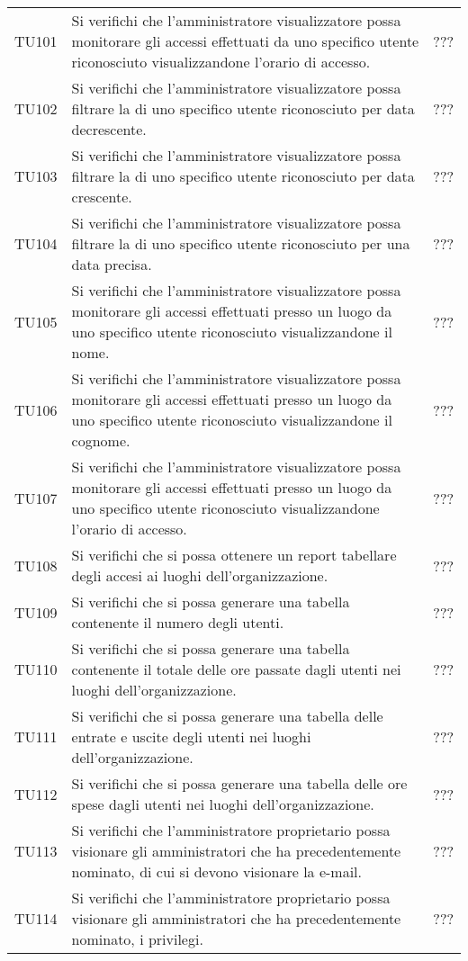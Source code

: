 {\begin{longtable}{ c  C{9cm} C{1cm}}
TU101 & Si verifichi che l’amministratore visualizzatore possa monitorare gli accessi effettuati da uno specifico utente riconosciuto visualizzandone l’orario di accesso. & ??? \\
TU102 & Si verifichi che l’amministratore visualizzatore possa filtrare la  di uno specifico utente riconosciuto per data decrescente. & ??? \\
TU103 & Si verifichi che l’amministratore visualizzatore possa filtrare la  di uno specifico utente riconosciuto per data crescente. & ??? \\
TU104 & Si verifichi che l’amministratore visualizzatore possa filtrare la  di uno specifico utente riconosciuto per una data precisa. & ??? \\
TU105 & Si verifichi che l’amministratore visualizzatore possa monitorare gli accessi effettuati presso un luogo da uno specifico utente riconosciuto visualizzandone il nome. & ??? \\
TU106 & Si verifichi che l’amministratore visualizzatore possa monitorare gli accessi effettuati presso un luogo da uno specifico utente riconosciuto visualizzandone il cognome. & ??? \\
TU107 & Si verifichi che l’amministratore visualizzatore possa monitorare gli accessi effettuati presso un luogo da uno specifico utente riconosciuto visualizzandone l’orario di accesso. & ??? \\
TU108 & Si verifichi che si possa ottenere un report tabellare degli accesi ai luoghi dell'organizzazione. & ??? \\
TU109 & Si verifichi che si possa generare una tabella contenente il numero degli utenti. & ??? \\
TU110 & Si verifichi che si possa generare una tabella contenente il totale delle ore passate dagli utenti nei luoghi dell’organizzazione. & ??? \\
TU111 & Si verifichi che si possa generare una tabella delle entrate e uscite degli utenti nei luoghi dell'organizzazione. & ??? \\
TU112 & Si verifichi che si possa generare una tabella delle ore spese dagli utenti nei luoghi dell'organizzazione. & ??? \\
TU113 & Si verifichi che l’amministratore proprietario possa visionare gli amministratori che ha precedentemente nominato, di cui si devono visionare la e-mail. & ??? \\
TU114 & Si verifichi che l’amministratore proprietario possa visionare gli amministratori che ha precedentemente nominato, i privilegi. & ??? \\

\end{longtable}}
